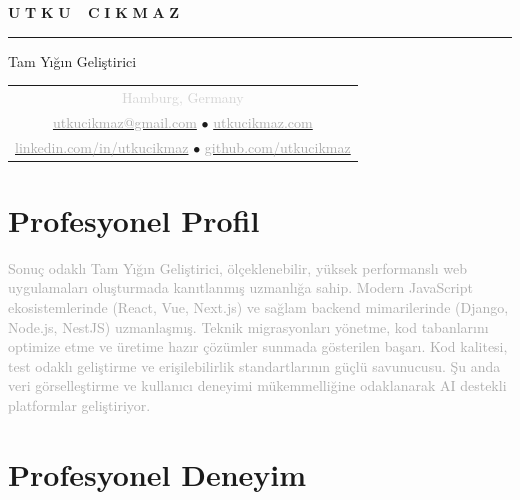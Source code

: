 \documentclass[10pt,a4paper]{article}
\newcommand{\gradientname}[1]{%
  \textcolor{darkgray!90}{\Huge\bfseries U}%
  \textcolor{darkgray!80}{\Huge\bfseries T}%
  \textcolor{darkgray!70}{\Huge\bfseries K}%
  \textcolor{darkgray!60}{\Huge\bfseries U}%
  \textcolor{mediumgray!90}{\Huge\bfseries\ }%
  \textcolor{mediumgray!80}{\Huge\bfseries C}%
  \textcolor{mediumgray!70}{\Huge\bfseries I}%
  \textcolor{mediumgray!60}{\Huge\bfseries K}%
  \textcolor{mediumgray!50}{\Huge\bfseries M}%
  \textcolor{lightgray!80}{\Huge\bfseries A}%
  \textcolor{lightgray!70}{\Huge\bfseries Z}%
}
\begin{document}
\color{black}
\pagestyle{empty}

\begin{center}
  \vspace{-3pt}
  \gradientname{UTKU CIKMAZ}
  
  \vspace{4pt}
  \textcolor{verylightgray}{\rule{0.35\textwidth}{0.6pt}}
  
  \vspace{4pt}
  {\large\color{mediumgray}Tam Yığın Geliştirici}
  
  \vspace{5pt}
  \begin{tabular}{c}
    \textcolor{lightgray}{\small Hamburg, Germany} \\[2pt]
    \href{mailto:utkucikmaz@gmail.com}{\textcolor{darkgray}{utkucikmaz@gmail.com}} \quad
    \textcolor{verylightgray}{$\bullet$} \quad
    \href{https://www.utkucikmaz.com}{\textcolor{darkgray}{utkucikmaz.com}} \\[1pt]
    \href{https://linkedin.com/in/utkucikmaz}{\textcolor{darkgray}{linkedin.com/in/utkucikmaz}} \quad
    \textcolor{verylightgray}{$\bullet$} \quad
    \href{https://github.com/utkucikmaz}{\textcolor{darkgray}{github.com/utkucikmaz}}
  \end{tabular}
\end{center}

\vspace{1pt}

\section*{Profesyonel Profil}
\vspace{0pt}
\textcolor{darkgray}{%
Sonuç odaklı Tam Yığın Geliştirici, ölçeklenebilir, yüksek performanslı web uygulamaları oluşturmada kanıtlanmış uzmanlığa sahip. Modern JavaScript ekosistemlerinde (React, Vue, Next.js) ve sağlam backend mimarilerinde (Django, Node.js, NestJS) uzmanlaşmış. Teknik migrasyonları yönetme, kod tabanlarını optimize etme ve üretime hazır çözümler sunmada gösterilen başarı. Kod kalitesi, test odaklı geliştirme ve erişilebilirlik standartlarının güçlü savunucusu. Şu anda veri görselleştirme ve kullanıcı deneyimi mükemmelliğine odaklanarak AI destekli platformlar geliştiriyor.
}
\vspace{1pt}

\section*{Profesyonel Deneyim}
\end{document}
